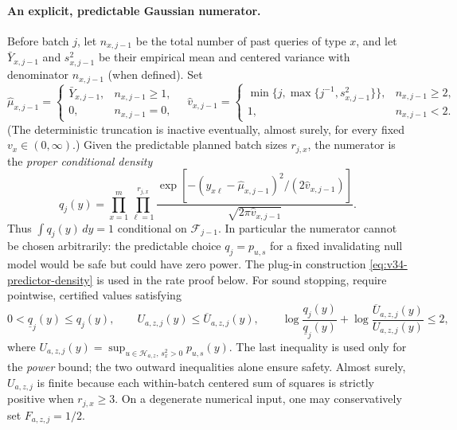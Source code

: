 \documentclass{article}
\theoremstyle{plain}
\theoremstyle{definition}
\begin{document}
\paragraph{An explicit, predictable Gaussian numerator.}
Before batch $j$, let $n_{x,j-1}$ be the total number of past queries of
type $x$, and let $\bar Y_{x,j-1}$ and $s^2_{x,j-1}$ be their empirical
mean and centered variance with denominator $n_{x,j-1}$ (when defined).
Set
\begin{equation}
 \widehat\mu_{x,j-1}=\begin{cases}\bar Y_{x,j-1},&n_{x,j-1}\ge1,\\0,&n_{x,j-1}=0,\end{cases}
 \quad
 \widehat v_{x,j-1}=\begin{cases}
 \min\{j,\max\{j^{-1},s^2_{x,j-1}\}\},&n_{x,j-1}\ge2,\\
 1,&n_{x,j-1}<2.
 \end{cases}
 \label{eq:v34-predictor-estimates}
\end{equation}
(The deterministic truncation is inactive eventually, almost surely,
for every fixed $v_x\in(0,\infty)$.) Given the predictable planned
batch sizes $r_{j,x}$, the numerator is the \emph{proper conditional
density}
\begin{equation}
 q_j(y)=\prod_{x=1}^{m}\prod_{\ell=1}^{r_{j,x}}
 \frac{\exp[-(y_{x\ell}-\widehat\mu_{x,j-1})^2/(2\widehat v_{x,j-1})]}
 {\sqrt{2\pi\widehat v_{x,j-1}}}.
 \label{eq:v34-predictor-density}
\end{equation}
Thus $\int q_j(y)\,dy=1$ conditional on $\mathcal F_{j-1}$.
In particular the numerator cannot be chosen arbitrarily: the
predictable choice $q_j=p_{u,s}$ for a fixed invalidating null model
would be safe but could have zero power. The plug-in construction
\eqref{eq:v34-predictor-density} is used in the rate proof below.
For sound stopping, require pointwise, certified values satisfying
\begin{equation}
 0<\underline q_j(y)\le q_j(y),\qquad
 U_{a,z,j}(y)\le\overline U_{a,z,j}(y),\qquad
 \log\frac{q_j(y)}{\underline q_j(y)}+
 \log\frac{\overline U_{a,z,j}(y)}{U_{a,z,j}(y)}\le2,
 \label{eq:v34-numeric-contract}
\end{equation}
where $U_{a,z,j}(y)=\sup_{u\in\mathcal H_{a,z},\,s_x^2>0}
 p_{u,s}(y)$. The last inequality is used only for the \emph{power}
bound; the two outward inequalities alone ensure safety. Almost surely,
$U_{a,z,j}$ is finite because each within-batch centered sum of squares
is strictly positive when $r_{j,x}\ge3$. On a degenerate numerical input,
one may conservatively set $F_{a,z,j}=1/2$.
\end{document}

